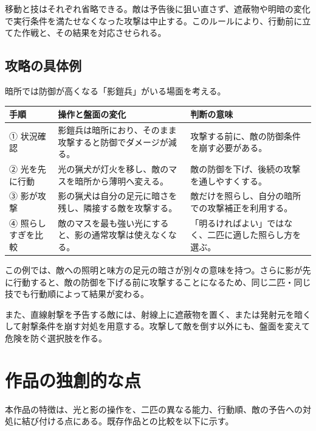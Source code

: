 \documentclass[a4paper,11pt,dvipdfmx]{jsarticle}
\begin{document}
移動と技はそれぞれ省略できる。敵は予告後に狙い直さず、遮蔽物や明暗の変化で実行条件を満たせなくなった攻撃は中止する。このルールにより、行動前に立てた作戦と、その結果を対応させられる。

\subsection{攻略の具体例}

暗所では防御が高くなる「影鎧兵」がいる場面を考える。

{\small
\begin{longtable}{@{}P{0.20\dimexpr{}\tabcolsep\relax}P{0.34\dimexpr{}\tabcolsep\relax}P{0.46\dimexpr{}\tabcolsep\relax}@{}}
\toprule
\textbf{手順} & \textbf{操作と盤面の変化} & \textbf{判断の意味} \\
\midrule
\endhead
① 状況確認 & 影鎧兵は暗所におり、そのまま攻撃すると防御でダメージが減る。 & 攻撃する前に、敵の防御条件を崩す必要がある。 \\
② 光を先に行動 & 光の猟犬が灯火を移し、敵のマスを暗所から薄明へ変える。 & 敵の防御を下げ、後続の攻撃を通しやすくする。 \\
③ 影が攻撃 & 影の猟犬は自分の足元に暗さを残し、隣接する敵を攻撃する。 & 敵だけを照らし、自分の暗所での攻撃補正を利用する。 \\
④ 照らしすぎを比較 & 敵のマスを最も強い光にすると、影の通常攻撃は使えなくなる。 & 「明るければよい」ではなく、二匹に適した照らし方を選ぶ。 \\
\bottomrule
\end{longtable}
}

この例では、敵への照明と味方の足元の暗さが別々の意味を持つ。さらに影が先に行動すると、敵の防御を下げる前に攻撃することになるため、同じ二匹・同じ技でも行動順によって結果が変わる。

また、直線射撃を予告する敵には、射線上に遮蔽物を置く、または発射元を暗くして射撃条件を崩す対処を用意する。攻撃して敵を倒す以外にも、盤面を変えて危険を防ぐ選択肢を作る。

\section{作品の独創的な点}

本作品の特徴は、光と影の操作を、二匹の異なる能力、行動順、敵の予告への対処に結び付ける点にある。既存作品との比較を以下に示す。
\end{document}
